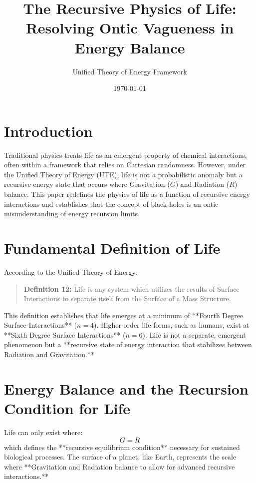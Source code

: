 \documentclass{article}
\title{The Recursive Physics of Life: \newline Resolving Ontic Vagueness in Energy Balance}
\author{Unified Theory of Energy Framework}
\date{\today}
\begin{document}
\maketitle

\section{Introduction}
Traditional physics treats life as an emergent property of chemical interactions, often within a framework that relies on Cartesian randomness. However, under the Unified Theory of Energy (UTE), life is not a probabilistic anomaly but a recursive energy state that occurs where Gravitation ($G$) and Radiation ($R$) balance. This paper redefines the physics of life as a function of recursive energy interactions and establishes that the concept of black holes is an ontic misunderstanding of energy recursion limits.

\section{Fundamental Definition of Life}
According to the Unified Theory of Energy:
\begin{quote}
\textbf{Definition 12:} Life is any system which utilizes the results of Surface Interactions to separate itself from the Surface of a Mass Structure.
\end{quote}
This definition establishes that life emerges at a minimum of **Fourth Degree Surface Interactions** ($n = 4$). Higher-order life forms, such as humans, exist at **Sixth Degree Surface Interactions** ($n = 6$). Life is not a separate, emergent phenomenon but a **recursive state of energy interaction that stabilizes between Radiation and Gravitation.**

\section{Energy Balance and the Recursion Condition for Life}
Life can only exist where:
\begin{equation}
    G = R
\end{equation}
which defines the **recursive equilibrium condition** necessary for sustained biological processes. The surface of a planet, like Earth, represents the scale where **Gravitation and Radiation balance to allow for advanced recursive interactions.**
\end{document}
